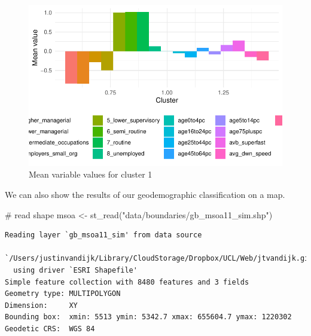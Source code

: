\documentclass[
  letterpaper,
  DIV=11,
  numbers=noendperiod]{scrreprt}
\newenvironment{Shaded}{\begin{snugshade}}{\end{snugshade}}
\newcommand{\CommentTok}[1]{\textcolor[rgb]{0.37,0.37,0.37}{#1}}
\newcommand{\FunctionTok}[1]{\textcolor[rgb]{0.28,0.35,0.67}{#1}}
\newcommand{\NormalTok}[1]{\textcolor[rgb]{0.00,0.23,0.31}{#1}}
\newcommand{\OtherTok}[1]{\textcolor[rgb]{0.00,0.23,0.31}{#1}}
\newcommand{\StringTok}[1]{\textcolor[rgb]{0.13,0.47,0.30}{#1}}
\begin{document}
\begin{figure}[H]

{\centering \includegraphics{01-geodemographics_files/figure-pdf/fig-geo-plot-those-clusters-with-a-graph-just-one-1.pdf}

}

\caption{\label{fig-geo-plot-those-clusters-with-a-graph-just-one}Mean
variable values for cluster 1}

\end{figure}

We can also show the results of our geodemographic classification on a
map.

\begin{codelisting}

\caption{\texttt{R code}}

\begin{Shaded}
\begin{Highlighting}[]
\CommentTok{\# read shape}
\NormalTok{msoa }\OtherTok{\textless{}{-}} \FunctionTok{st\_read}\NormalTok{(}\StringTok{"data/boundaries/gb\_msoa11\_sim.shp"}\NormalTok{)}
\end{Highlighting}
\end{Shaded}

\end{codelisting}

\begin{verbatim}
Reading layer `gb_msoa11_sim' from data source 
  `/Users/justinvandijk/Library/CloudStorage/Dropbox/UCL/Web/jtvandijk.github.io/GEOG0114Q/data/boundaries/gb_msoa11_sim.shp' 
  using driver `ESRI Shapefile'
Simple feature collection with 8480 features and 3 fields
Geometry type: MULTIPOLYGON
Dimension:     XY
Bounding box:  xmin: 5513 ymin: 5342.7 xmax: 655604.7 ymax: 1220302
Geodetic CRS:  WGS 84
\end{verbatim}
\end{document}
